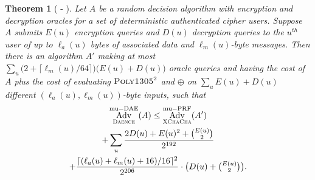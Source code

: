 \documentclass[draft]{article}
\newtheorem{theorem}{Theorem}
\def\operatorsc#1{{%
  \ifmmode\let\next=\operatorname\else\let\next=\relax\fi\next{\textsc{#1}}}}
\def\ChaCha#1/{\operatorsc{ChaCha#1}}
\def\XChaCha#1/{\operatorsc{XChaCha#1}}
\def\Poly#1/{\operatorsc{Poly#1}}
\def\Daence/{\operatorsc{Daence}}
\DeclareMathOperator{\Adv}{Adv}
\DeclareMathOperator{\muDAE}{mu-DAE}
\DeclareMathOperator{\muPRF}{mu-PRF}
\begin{document}
\begin{theorem}[\ChaCha/-\Daence/]\label{thm-chacha-daence}
  Let $A$ be a random decision algorithm with encryption and
   decryption oracles for a set of deterministic authenticated
   cipher users.
  Suppose $A$ submits $E(u)$ encryption queries and $D(u)$ decryption
   queries to the $u^{\mathit{th}}$ user of up to $\ell_a(u)$ bytes of
   associated data and $\ell_m(u)$-byte messages.
  Then there is an algorithm $A'$ making at most
   $\sum_u \bigl(2 + \lceil\ell_m(u)/64\rceil\bigr)
     \bigl(E(u) + D(u)\bigr)$
   oracle queries and having the cost of $A$ plus the cost of
   evaluating $\Poly1305/^2$ and $\oplus$ on
   $\sum_u E(u) + D(u)$
   different $(\ell_a(u), \ell_m(u))$-byte inputs,
   such that
%
  \begin{multline*}
    \Adv^{\muDAE}_{\Daence/}(A)
     \leq \Adv^{\muPRF}_{\XChaCha/}(A') \\
            + \sum_u
                \frac{2 D(u) + E(u)^2 + \binom{E(u)}{2}}
                     {2^{192}} \\
                + \frac{\lceil(\ell_a(u) + \ell_m(u) + 16)/16\rceil^2}{2^{206}}
                  \cdot
                  {\textstyle\bigl(D(u) + \binom{E(u)}{2}\bigr)}.
  \end{multline*}
\end{theorem}



\end{document}
